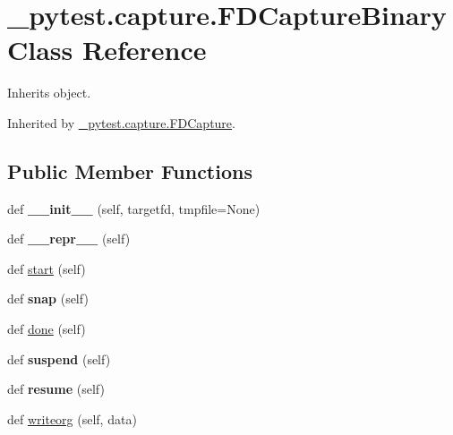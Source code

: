 \hypertarget{class__pytest_1_1capture_1_1_f_d_capture_binary}{}\section{\+\_\+pytest.\+capture.\+F\+D\+Capture\+Binary Class Reference}
\label{class__pytest_1_1capture_1_1_f_d_capture_binary}


Inherits object.



Inherited by \hyperlink{class__pytest_1_1capture_1_1_f_d_capture}{\+\_\+pytest.\+capture.\+F\+D\+Capture}.

\subsection*{Public Member Functions}
\begin{DoxyCompactItemize}
\item 
\mbox{\label{class__pytest_1_1capture_1_1_f_d_capture_binary_abe6aead16849f48bec59f43b173fef42}} 
def {\bfseries \+\_\+\+\_\+init\+\_\+\+\_\+} (self, targetfd, tmpfile=None)
\item 
\mbox{\label{class__pytest_1_1capture_1_1_f_d_capture_binary_a021230e6ffaf7f32913310a46f27296d}} 
def {\bfseries \+\_\+\+\_\+repr\+\_\+\+\_\+} (self)
\item 
def \hyperlink{class__pytest_1_1capture_1_1_f_d_capture_binary_a57dc7b974c30533a7eedcb579d1d2dcc}{start} (self)
\item 
\mbox{\label{class__pytest_1_1capture_1_1_f_d_capture_binary_a9e364ce9c5a6d24d916a1baded22e489}} 
def {\bfseries snap} (self)
\item 
def \hyperlink{class__pytest_1_1capture_1_1_f_d_capture_binary_a2d9e74a114b573728ee03fb7a7c002cd}{done} (self)
\item 
\mbox{\label{class__pytest_1_1capture_1_1_f_d_capture_binary_a46c886eaffd56d8ca2612ef8ace964ff}} 
def {\bfseries suspend} (self)
\item 
\mbox{\label{class__pytest_1_1capture_1_1_f_d_capture_binary_aa2eb67c5a0c6d1d210cd111280d2cd23}} 
def {\bfseries resume} (self)
\item 
def \hyperlink{class__pytest_1_1capture_1_1_f_d_capture_binary_a574b9bd489894a42476661b0c08de6bd}{writeorg} (self, data)
\end{DoxyCompactItemize}

